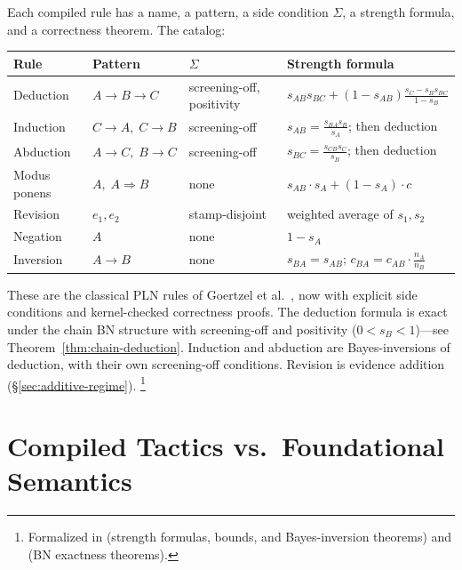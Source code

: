 \documentclass[11pt,openany]{report}
\begin{document}
Each compiled rule has a name, a pattern, a side condition $\Sigma$,
a strength formula, and a correctness theorem.  The catalog:

\medskip
{\footnotesize
\begin{center}
\begin{tabular}{llll}
\toprule
\textbf{Rule} & \textbf{Pattern} & \textbf{$\Sigma$}
  & \textbf{Strength formula} \\
\midrule
Deduction & $A \!\to\! B \!\to\! C$
  & screening-off, positivity
  & $s_{AB} s_{BC} + (1\!-\!s_{AB})\frac{s_C - s_B s_{BC}}{1 - s_B}$ \\[3pt]
Induction & $C \!\to\! A,\; C \!\to\! B$
  & screening-off
  & $s_{AB} \!=\! \frac{s_{BA} s_B}{s_A}$; then deduction \\[3pt]
Abduction & $A \!\to\! C,\; B \!\to\! C$
  & screening-off
  & $s_{BC} \!=\! \frac{s_{CB} s_C}{s_B}$; then deduction \\[3pt]
Modus ponens & $A,\; A \!\Rightarrow\! B$
  & none
  & $s_{AB} \cdot s_A + (1\!-\!s_A) \cdot c$ \\[3pt]
Revision & $e_1, e_2$
  & stamp-disjoint
  & weighted average of $s_1, s_2$ \\[3pt]
Negation & $A$
  & none
  & $1 - s_A$ \\[3pt]
Inversion & $A \!\to\! B$
  & none
  & $s_{BA} \!=\! s_{AB}$;\; $c_{BA} \!=\! c_{AB} \!\cdot\! \tfrac{n_A}{n_B}$ \\
\bottomrule
\end{tabular}
\end{center}}
\medskip

\noindent
These are the classical PLN rules of Goertzel et
al.~\cite{goertzel2009pln}, now with explicit side conditions and
kernel-checked correctness proofs.  The deduction formula is exact
under the chain BN structure with screening-off and positivity
($0 < s_B < 1$)---see Theorem~\ref{thm:chain-deduction}.
Induction and abduction are
Bayes-inversions of deduction, with their own screening-off
conditions.  Revision is evidence addition
(\S\ref{sec:additive-regime}).%
\footnote{Formalized in 
(strength formulas, bounds, and Bayes-inversion theorems) and
 (BN exactness
theorems).}

\section{Compiled Tactics vs.\ Foundational Semantics}
\end{document}
